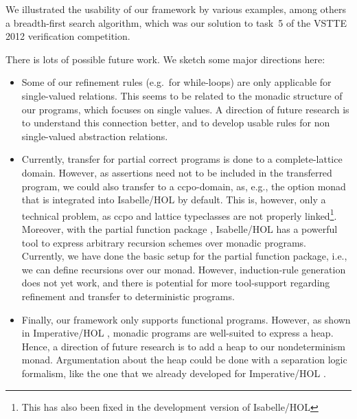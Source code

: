 \documentclass[11pt,a4paper]{book}
\begin{document}
We illustrated the usability of our framework by various examples, among others
a breadth-first search algorithm, which was our solution to task~5 of the VSTTE 
2012 verification competition.

There is lots of possible future work. We sketch some major directions here:
\begin{itemize}
\item
Some of our refinement rules (e.g.\ for while-loops) are only applicable for
single-valued relations. This seems to be related to the monadic structure of
our programs, which focuses on single values. A direction of future research is
to understand this connection better, and to develop usable rules for 
non single-valued abstraction relations.
\item
Currently, transfer for partial correct programs is done to a complete-lattice
domain. However, as assertions need not to be included in the transferred program,
we could also transfer to a ccpo-domain, as, e.g., the option monad that is 
integrated into Isabelle/HOL by default. This is, however, only a technical 
problem, as ccpo and lattice typeclasses are not properly 
linked\footnote{This has also been fixed in the development version of 
Isabelle/HOL}.
Moreover, with the partial function package \cite{Kr10}, 
Isabelle/HOL has a powerful tool to express arbitrary recursion schemes over 
monadic programs. Currently, we have done the basic setup for the partial 
function package, i.e., we can define recursions over our monad. However, 
induction-rule generation does not yet work, and there is potential for more 
tool-support regarding refinement and transfer to deterministic programs.
\item
Finally, our framework only supports functional programs. However, as shown in
Imperative/HOL \cite{BKHEM08}, monadic programs are well-suited to 
express a heap. Hence, a direction of future research is to add a heap to our
nondeterminism monad. Argumentation about the heap could be done with a 
separation logic \cite{Rey02} formalism, like the one that we already 
developed for Imperative/HOL \cite{Meis2011}.
\end{itemize}



\end{document}
